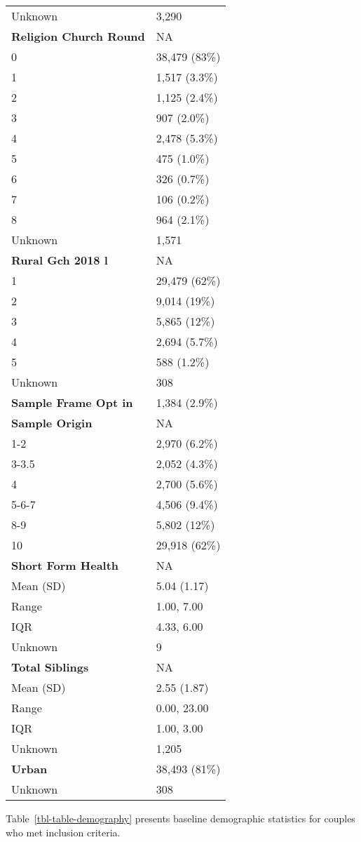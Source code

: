 \documentclass[
  singlecolumn]{article}
\begin{document}
\begin{longtable}[]{@{}ll@{}}
Unknown & 3,290 \\
\textbf{Religion Church Round} & NA \\
0 & 38,479 (83\%) \\
1 & 1,517 (3.3\%) \\
2 & 1,125 (2.4\%) \\
3 & 907 (2.0\%) \\
4 & 2,478 (5.3\%) \\
5 & 475 (1.0\%) \\
6 & 326 (0.7\%) \\
7 & 106 (0.2\%) \\
8 & 964 (2.1\%) \\
Unknown & 1,571 \\
\textbf{Rural Gch 2018 l} & NA \\
1 & 29,479 (62\%) \\
2 & 9,014 (19\%) \\
3 & 5,865 (12\%) \\
4 & 2,694 (5.7\%) \\
5 & 588 (1.2\%) \\
Unknown & 308 \\
\textbf{Sample Frame Opt in} & 1,384 (2.9\%) \\
\textbf{Sample Origin} & NA \\
1-2 & 2,970 (6.2\%) \\
3-3.5 & 2,052 (4.3\%) \\
4 & 2,700 (5.6\%) \\
5-6-7 & 4,506 (9.4\%) \\
8-9 & 5,802 (12\%) \\
10 & 29,918 (62\%) \\
\textbf{Short Form Health} & NA \\
Mean (SD) & 5.04 (1.17) \\
Range & 1.00, 7.00 \\
IQR & 4.33, 6.00 \\
Unknown & 9 \\
\textbf{Total Siblings} & NA \\
Mean (SD) & 2.55 (1.87) \\
Range & 0.00, 23.00 \\
IQR & 1.00, 3.00 \\
Unknown & 1,205 \\
\textbf{Urban} & 38,493 (81\%) \\
Unknown & 308 \\
\end{longtable}

Table~\ref{tbl-table-demography} presents baseline demographic
statistics for couples who met inclusion criteria.
\end{document}
